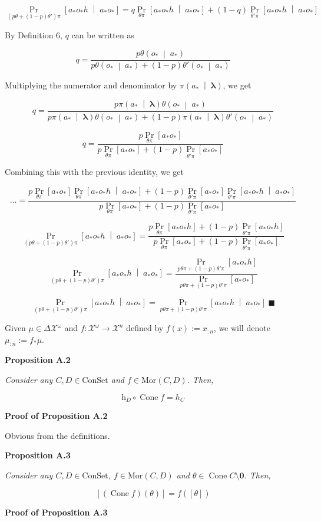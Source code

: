 \documentclass[a4paper]{article}
\newcommand{\Co}[1]{}
\newcommand{\AP}[1]{\left(#1\right)}
\newcommand{\AB}[1]{\left[#1\right]}
\newcommand{\APM}[2]{\left(#1\;\middle\vert\;#2\right)}
\newcommand{\ABM}[2]{\left[#1\;\middle\vert\;#2\right]}
\newcommand{\Pa}[2]{\underset{#1}{\operatorname{Pr}}\AB{#2}}
\newcommand{\CP}[3]{\underset{#1}{\operatorname{Pr}}\ABM{#2}{#3}}
\newcommand{\Mor}{\mathrm{Mor}}
\newcommand{\Estr}{\boldsymbol{\lambda}} %
\newcommand{\Con}{{\boldsymbol{\mathrm{ConSet}}}}
\DeclareMathOperator{\Cone}{Cone}
\newcommand{\Ht}{\mathrm{h}}
\newcommand{\X}{\mathcal{X}}
\begin{document}
$$\CP{\AP{p\theta+(1-p)\theta'}\pi}{a_*o_*h}{a_*o_*}=q\CP{\theta\pi}{a_*o_*h}{a_*o_*}+(1-q)\CP{\theta'\pi}{a_*o_*h}{a_*o_*}$$

By Definition 6, $q$ can be written as

$$q=\frac{p\theta\APM{o_*}{a_*}}{p\theta\APM{o_*}{a_*}+(1-p)\theta'\APM{o_*}{a_*}}$$

Multiplying the numerator and denominator by $\pi\APM{a_*}{\Estr}$, we get

$$q=\frac{p\pi\APM{a_*}{\Estr}\theta\APM{o_*}{a_*}}{p\pi\APM{a_*}{\Estr}\theta\APM{o_*}{a_*}+(1-p)\pi\APM{a_*}{\Estr}\theta'\APM{o_*}{a_*}}$$

$$q=\frac{p\Pa{\theta\pi}{a_*o_*}}{p\Pa{\theta\pi}{a_*o_*}+(1-p)\Pa{\theta'\pi}{a_*o_*}}$$

Combining this with the previous identity, we get 

$$\ldots=\frac{p\Pa{\theta\pi}{a_*o_*}\CP{\theta\pi}{a_*o_*h}{a_*o_*}+(1-p)\Pa{\theta'\pi}{a_*o_*}\CP{\theta'\pi}{a_*o_*h}{a_*o_*}}{p\Pa{\theta\pi}{a_*o_*}+(1-p)\Pa{\theta'\pi}{a_*o_*}}$$

$$\CP{\AP{p\theta+(1-p)\theta'}\pi}{a_*o_*h}{a_*o_*}=\frac{p\Pa{\theta\pi}{a_*o_*h}+(1-p)\Pa{\theta'\pi}{a_*o_*h}}{p\Pa{\theta\pi}{a_*o_*}+(1-p)\Pa{\theta'\pi}{a_*o_*}}$$

$$\CP{\AP{p\theta+(1-p)\theta'}\pi}{a_*o_*h}{a_*o_*}=\frac{\Pa{p\theta\pi+(1-p)\theta'\pi}{a_*o_*h}}{\Pa{p\theta\pi+(1-p)\theta'\pi}{a_*o_*}}$$

$$\CP{\AP{p\theta+(1-p)\theta'}\pi}{a_*o_*h}{a_*o_*}=\CP{p\theta\pi+(1-p)\theta'\pi}{a_*o_*h}{a_*o_*}\ \blacksquare$$

Given $\mu\in\Delta\X^\omega$ and $f:\mathcal{X}^\omega\rightarrow\mathcal{X}^n$ defined by $f(x):=x_{:n}$, we will denote $\mu_{:n}:=f_*\mu$.

\textbf{Proposition A.2}\Co{b}

\textit{Consider any $C,D\in\Con$ and $f\in\Mor(C,D)$. Then,}\Co{i}

$$\Ht_D\circ \Cone f=h_C$$

\textbf{Proof of Proposition A.2}\Co{b}

Obvious from the definitions.

\textbf{Proposition A.3}\Co{b}

\textit{Consider any $C,D\in\Con$, $f\in\Mor(C,D)$ and $\theta\in\Cone C\setminus\boldsymbol{0}$. Then,}\Co{i}

$$\AB{\AP{\Cone f}(\theta)}=f\AP{\AB{\theta}}$$

\textbf{Proof of Proposition A.3}\Co{b}
\end{document}
